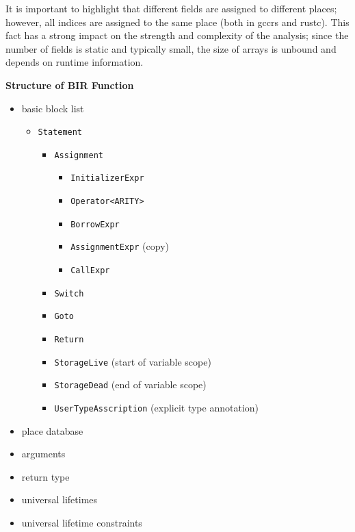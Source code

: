 \documentclass[
  11pt,
]{report}
\providecommand{\tightlist}{%
  \setlength{\itemsep}{0pt}\setlength{\parskip}{0pt}}
\renewenvironment{quote}{\begin{myquote}}{\end{myquote}}
\begin{document}
It is important to highlight that different fields are assigned to
different places; however, all indices are assigned to the same place
(both in gccrs and rustc). This fact has a strong impact on the strength
and complexity of the analysis; since the number of fields is static and
typically small, the size of arrays is unbound and depends on runtime
information.

\begin{quote}
\textbf{Structure of BIR Function}

\begin{itemize}
\tightlist
\item
  basic block list

  \begin{itemize}
  \tightlist
  \item
    \texttt{Statement}

    \begin{itemize}
    \tightlist
    \item
      \texttt{Assignment}

      \begin{itemize}
      \tightlist
      \item
        \texttt{InitializerExpr}
      \item
        \texttt{Operator\textless{}ARITY\textgreater{}}
      \item
        \texttt{BorrowExpr}
      \item
        \texttt{AssignmentExpr} (copy)
      \item
        \texttt{CallExpr}
      \end{itemize}
    \item
      \texttt{Switch}
    \item
      \texttt{Goto}
    \item
      \texttt{Return}
    \item
      \texttt{StorageLive} (start of variable scope)
    \item
      \texttt{StorageDead} (end of variable scope)
    \item
      \texttt{UserTypeAsscription} (explicit type annotation)
    \end{itemize}
  \end{itemize}
\item
  place database
\item
  arguments
\item
  return type
\item
  universal lifetimes
\item
  universal lifetime constraints
\end{itemize}
\end{quote}
\end{document}

